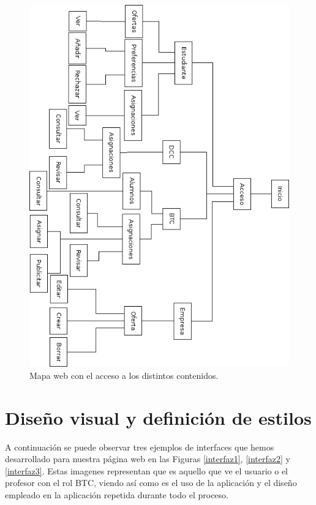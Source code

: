 \documentclass[pdftex,11pt,a4paper]{book}
\begin{document}
\begin{figure}[h]
\begin{center}
\includegraphics[width=\textwidth]{img/arbol_web}
\caption{\label{mapa_web} Mapa web con el acceso a los distintos contenidos.}
\end{center}
\end{figure}

\section{Diseño visual y definición de estilos}


A continuación se puede observar tres ejemplos de interfaces que hemos desarrollado para nuestra página web en las Figuras \ref{interfaz1}, \ref{interfaz2} y \ref{interfaz3}. Estas imagenes representan que es aquello que ve el usuario o el profesor con el rol BTC, viendo así como es el uso de la aplicación y el diseño empleado en la aplicación repetida durante todo el proceso.
\end{document}
